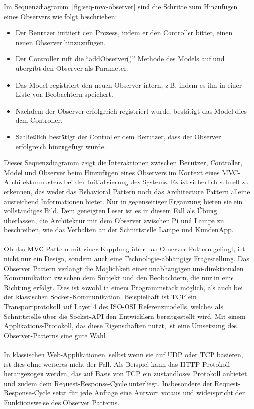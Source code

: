 Im Sequenzdiagramm~\ref{fig:seq-mvc-observer} sind die Schritte zum Hinzufügen eines Observers wie folgt beschrieben:
\begin{itemize}
\item Der Benutzer initiiert den Prozess, indem er den Controller bittet, einen neuen Observer hinzuzufügen.
\item Der Controller ruft die \enquote{addObserver()} Methode des Models auf und übergibt den Observer als Parameter.
\item Das Model registriert den neuen Observer intern, z.B. indem es ihn in einer Liste von Beobachtern speichert.
\item Nachdem der Observer erfolgreich registriert wurde, bestätigt das Model dies dem Controller.
\item Schließlich bestätigt der Controller dem Benutzer, dass der Observer erfolgreich hinzugefügt wurde.
\end{itemize}
Dieses Sequenzdiagramm zeigt die Interaktionen zwischen Benutzer, Controller, Model und Observer beim Hinzufügen eines Observers im Kontext eines MVC-Architekturmusters bei der Initialisierung des Systems. Es ist sicherlich schnell zu erkennen, das weder das Behavioral Pattern noch das Architecture Pattern alleine ausreichend Informationen bietet. Nur in gegenseitiger Ergänzung bieten sie ein vollständiges Bild. Dem geneigten Leser ist es in diesem Fall als Übung überlassen, die Architektur mit dem Observer zwischen Pi und Lampe zu beschreiben, wie das Verhalten an der Schnittstelle Lampe und KundenApp. 
\\\\
Ob das MVC-Pattern mit einer Kopplung über das Observer Pattern gelingt, ist nicht nur ein Design, sondern auch eine Technologie-abhängige Fragestellung. Das Observer Pattern verlangt die Möglichkeit einer unabhängigen uni-direktionalen Kommunikation zwischen dem Subjekt und den Beobachtern, die nur in eine Richtung erfolgt. Dies ist sowohl in einem Programmstack möglich, als auch bei der klassischen Socket-Kommunikation. Beispielhaft ist TCP ein Transportprotokoll auf Layer 4 des ISO-OSI Referenzmodells, welches als Schnittstelle über die Socket-API den Entwicklern bereitgestellt wird. Mit einem Applikations-Protokoll, das diese Eigenschaften nutzt, ist eine Umsetzung des Observer-Patterns eine gute Wahl. 
\\\\
In klassischen Web-Applikationen, selbst wenn sie auf UDP oder TCP basieren, ist dies ohne weiteres nicht der Fall. Als Beispiel kann das HTTP Protokoll herangezogen werden, das auf Basis von TCP ein zustandloses Protokoll anbietet und zudem dem Request-Response-Cycle unterliegt. Insbesondere der Request-Response-Cycle setzt für jede Anfrage eine Antwort voraus und widerspricht der Funktionsweise des Observer Patterns.
